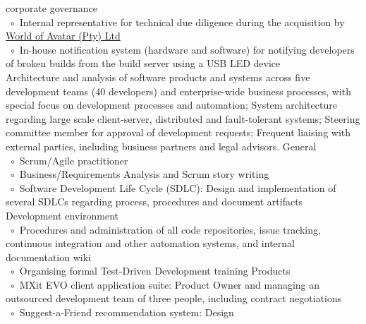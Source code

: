 \documentclass[10pt,a4paper,final]{columncv}
\newcommand{\cvitembullet}{~$\circ$~}
\newcommand{\cvitempbullet}{\phantom{\cvitembullet}}
\begin{document}
\begin{cvenv}
{         \cvitempbullet corporate governance \\
         \cvitembullet Internal representative for technical due diligence during the 
         \cvitempbullet acquisition by \href{http://www.worldofavatar.com/}{World of Avatar (Pty) Ltd} \\
         \cvitembullet In-house notification system (hardware and software) for notifying 
         \cvitempbullet developers of broken builds from the build server using a USB
         \cvitempbullet LED device
         \\}
         {Architecture and analysis of software products and systems across five 
          development teams (40 developers) and enterprise-wide business processes, with 
          special focus on development processes and automation; System architecture 
          regarding large scale client-server, distributed and fault-tolerant systems; 
          Steering committee member for approval of development requests; Frequent 
          liaising with external parties, including business partners and legal advisors.}
         {General \\
          \cvitembullet Scrum/Agile practitioner \\
          \cvitembullet Business/Requirements Analysis and Scrum story writing \\
          \cvitembullet Software Development Life Cycle (SDLC): Design and 
          \cvitempbullet implementation of several SDLCs regarding process, procedures 
          \cvitempbullet and document artifacts \\
          Development environment \\
          \cvitembullet Procedures and administration of all code repositories, issue 
          \cvitempbullet tracking, continuous integration and other automation systems, 
          \cvitempbullet and internal documentation wiki \\
          \cvitembullet Organising formal Test-Driven Development training 
          Products \\
          \cvitembullet MXit EVO client application suite: Product Owner and managing 
          \cvitempbullet an outsourced development team of three people, including 
          \cvitempbullet contract negotiations \\
          \cvitembullet Suggest-a-Friend recommendation system: Design \\
}
\end{cvenv}
\end{document}
